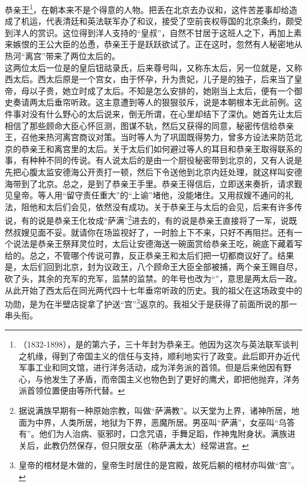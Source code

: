   恭亲王\footnote{（1832-1898），是的第六子，三十年封为恭亲王。他因为这次与英法联军谈判之机缘，得到了帝国主义的信任与支持，顺利地实行了政变。此后即开办近代军事工业和同文馆，进行洋务活动，成为洋务派的首领。但是后来他因有野心，与他发生了矛盾，而帝国主义也物色到了更好的鹰犬，即把他抛弃，洋务派首领位置便由等所代替。}，在朝本来不是个得意的人物。把丢在北京去办议和，这件苦差事却给造成了机运，代表清廷和英法联军办了和议，接受了空前丧权辱国的北京条约，颇受到洋人的赏识。这位得到洋人支持的“皇叔”，自然不甘居于这班人之下，再加上素来嫉恨的王公大臣的怂恿，恭亲王于是跃跃欲试了。正在这时，忽然有人秘密地从热河“离宫”带来了两位太后的。\\

  这两位太后一位是的皇后钮祜录氏，后来尊号叫，又称东太后，另一位就是，又称西太后。西太后原是一个宫女，由于怀孕，升为贵妃，儿子是的独子，后来当了皇帝，母以子贵，她立时成了太后。不知是怎么安排的，她刚当上太后，便有一个御史奏请两太后垂帘听政。这主意遭到等人的狠狠驳斥，说是本朝根本无此前例。这件事对没有什么野心的太后说来，倒无所谓，在心里却结下了深仇。她首先让太后相信了那些顾命大臣心怀叵测，图谋不轨，然后又获得的同意，秘密传信给恭亲王，召他来热河离宫商议对策。当时等人为了巩固既得势力，曾多方设法来防范北京的恭亲王和离宫里的太后。关于太后们如何避过等人的耳目和恭亲王取得联系的事，有种种不同的传说。有人说太后的是由一个厨役秘密带到北京的，又有人说是先把心腹太监安德海公开责打一顿，然后下令送他到北京内廷处理，就这样叫安德海带到了北京。总之，是到了恭亲王手里。恭亲王得信后，立即送来奏折，请求觐见皇帝。等人用“留守责任重大”的“上谕”堵他，没能堵住。又用叔嫂不通问的礼法，阻他和太后们会见，依然没有成功。关于恭亲王与太后的会见，后来有许多传说，有的说是恭亲王化妆成“萨满”\footnote{据说满族早期有一种原始宗教，叫做“萨满教”。以天堂为上界，诸神所居，地面为中界，人类所居，地狱为下界，恶魔所居。男巫叫“萨满”，女巫叫“乌答有”。他们为人治病、驱邪时，口念咒语，手舞足蹈，作神鬼附身状。满族进关后，此教仍然保存，但只限女巫（称萨满太太）经常进宫。}进去的，有的说是恭亲王直接将了一军，说既然叔嫂见面不妥。就请你在场监视好了，一时脸上下不来，只好不再阻拦。还有一个说法是恭亲王祭拜灵位时，太后让安德海送一碗面赏给恭亲王吃，碗底下藏着写给的。总之，不管哪个传说可靠，反正恭亲王和太后们把一切都商议好了。结果是，太后们回到北京，封为议政王，八个顾命王大臣全部被捕，两个亲王赐自尽，砍了头，其余的充军的充军，监禁的监禁。的年号也改为“”，意思是两太后一政。从此开始了西太后在同光两代四十七年垂帘听政的历史。我的祖父在这场政变中的功勋，是为在半壁店捉拿了护送“宫”\footnote{皇帝的棺材是木做的，皇帝生时居住的是宫殿，故死后躺的棺材亦叫做“宫”。}返京的。我祖父于是获得了前面所说的那一串头衔。\\

